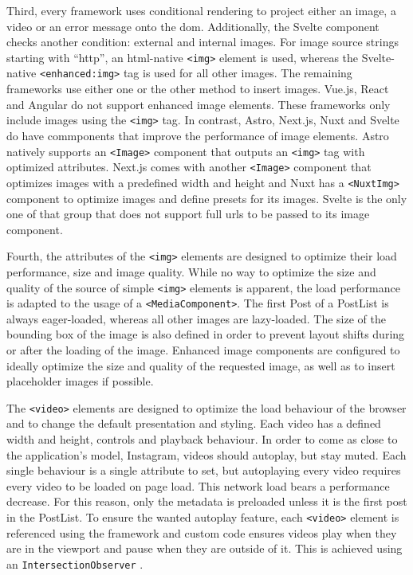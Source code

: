\documentclass[a4paper, 10pt]{article}
\begin{document}
Third, every framework uses conditional rendering to project either an image, a video or an error message onto the \acrshort{dom}.
Additionally, the Svelte component checks another condition: external and internal images.
For image source strings starting with \enquote{http}, an \acrshort{html}-native \verb|<img>| element is used, whereas the Svelte-native \verb|<enhanced:img>| tag is used for all other images.
The remaining frameworks use either one or the other method to insert images.
Vue.js, React and Angular do not support enhanced image elements.
These frameworks only include images using the \verb|<img>| tag.
In contrast, Astro, Next.js, Nuxt and Svelte do have commponents that improve the performance of image elements.
Astro natively supports an \verb|<Image>| component that outputs an \verb|<img>| tag with optimized attributes.
Next.js comes with another \verb|<Image>| component that optimizes images with a predefined width and height and Nuxt has a \verb|<NuxtImg>| component to optimize images and define presets for its images.
Svelte is the only one of that group that does not support full \acrshort{url}s to be passed to its image component.

Fourth, the attributes of the \verb|<img>| elements are designed to optimize their load performance, size and image quality.
While no way to optimize the size and quality of the source of simple \verb|<img>| elements is apparent, the load performance is adapted to the usage of a \verb|<MediaComponent>|.
The first Post of a PostList is always eager-loaded, whereas all other images are lazy-loaded.
The size of the bounding box of the image is also defined in order to prevent layout shifts during or after the loading of the image.
Enhanced image components are configured to ideally optimize the size and quality of the requested image, as well as to insert placeholder images if possible.

The \verb|<video>| elements are designed to optimize the load behaviour of the browser and to change the default presentation and styling.
Each video has a defined width and height, controls and playback behaviour.
In order to come as close to the application's model, Instagram, videos should autoplay, but stay muted.
Each single behaviour is a single attribute to set, but autoplaying every video requires every video to be loaded on page load.
This network load bears a performance decrease.
For this reason, only the metadata is preloaded unless it is the first post in the PostList.
To ensure the wanted autoplay feature, each \verb|<video>| element is referenced using the framework and custom code ensures videos play when they are in the viewport and pause when they are outside of it.
This is achieved using an \verb|IntersectionObserver| \citep{IntersectionObserver}.
\end{document}
